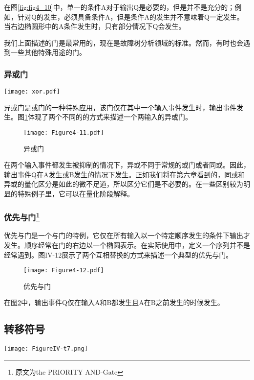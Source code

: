 \documentclass[cn,11pt,chinese]{elegantbook}
\begin{document}
在图\ref{fig:fig4_10}中，单一的条件A对于输出Q是必要的，但是并不是充分的；例如，针对Q的发生，必须具备条件A，但是条件A的发生并不意味着Q一定发生。当右边椭圆形中的A条件发生时，只有部分情况下Q会发生。

我们上面描述的门是最常用的，现在是故障树分析领域的标准。然而，有时也会遇到一些其他特殊用途的门。

\subsubsection{异或门}

\texttt{[image: xor.pdf]}

异或门是或门的一种特殊应用，该门仅在其中一个输入事件发生时，输出事件发生。图\ref{fig:fig4_11}体现了两个不同的的方式来描述一个两输入的异或门。

\begin{figure}[H]
	\centering
	\texttt{[image: Figure4-11.pdf]}
	\caption{异或门}\label{fig:fig4_11}
\end{figure}

在两个输入事件都发生被抑制的情况下，异或不同于常规的或门或者同或。因此，输出事件Q在A发生或B发生的情况下发生。正如我们将在第六章看到的，同或和异或的量化区分是如此的微不足道，所以区分它们是不必要的。在一些区别较为明显的特殊例子里，它可以在量化阶段解释。

\subsubsection{优先与门\footnote{原文为the PRIORITY AND-Gate}} 



优先与门是一个与门的特例，它仅在所有输入以一个特定顺序发生的条件下输出才发生。顺序经常在门的右边以一个椭圆表示。在实际使用中，定义一个序列并不是经常遇到。图IV-12展示了两个互相替换的方式来描述一个典型的优先与门。

\begin{figure}[h]
	\centering
	\texttt{[image: Figure4-12.pdf]}
	\caption{优先与门}\label{fig:fig4_12}
\end{figure}

在图\ref{fig:fig4_12}中，输出事件Q仅在输入A和B都发生且A在B之前发生的时候发生。

\subsection{转移符号}


\texttt{[image: FigureIV-t7.png]}
\end{document}
